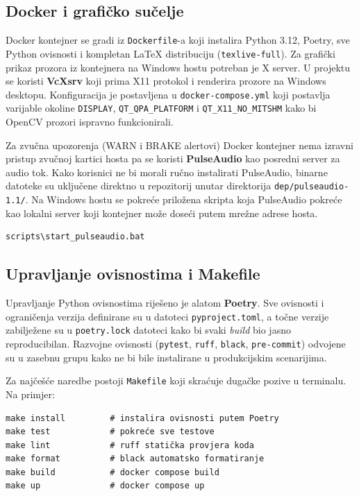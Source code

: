 \subsection{Docker i grafičko sučelje}

Docker kontejner se gradi iz \texttt{Dockerfile}-a koji instalira Python 3.12, Poetry, sve Python ovisnosti i kompletan LaTeX distribuciju (\texttt{texlive-full}). Za grafički prikaz prozora iz kontejnera na Windows hostu potreban je X server. U projektu se koristi \textbf{VcXsrv} koji prima X11 protokol i renderira prozore na Windows desktopu. Konfiguracija je postavljena u \texttt{docker-compose.yml} koji postavlja varijable okoline \texttt{DISPLAY}, \texttt{QT\_QPA\_PLATFORM} i \texttt{QT\_X11\_NO\_MITSHM} kako bi OpenCV prozori ispravno funkcionirali.

Za zvučna upozorenja (WARN i BRAKE alertovi) Docker kontejner nema izravni pristup zvučnoj kartici hosta pa se koristi \textbf{PulseAudio} kao posredni server za audio tok. Kako korisnici ne bi morali ručno instalirati PulseAudio, binarne datoteke su uključene direktno u repozitorij unutar direktorija \texttt{dep/pulseaudio-1.1/}. Na Windows hostu se pokreće priložena skripta koja PulseAudio pokreće kao lokalni server koji kontejner može doseći putem mrežne adrese hosta.

\begin{lstlisting}[style=bashcode, caption={Pokretanje PulseAudio servera na Windows hostu}, label={lst:pulseaudio}]
scripts\start_pulseaudio.bat
\end{lstlisting}

\subsection{Upravljanje ovisnostima i Makefile}

Upravljanje Python ovisnostima riješeno je alatom \textbf{Poetry}. Sve ovisnosti i ograničenja verzija definirane su u datoteci \texttt{pyproject.toml}, a točne verzije zabilježene su u \texttt{poetry.lock} datoteci kako bi svaki \textit{build} bio jasno reproducibilan. Razvojne ovisnosti (\texttt{pytest}, \texttt{ruff}, \texttt{black}, \texttt{pre-commit}) odvojene su u zasebnu grupu kako ne bi bile instalirane u produkcijskim scenarijima.

Za najčešće naredbe postoji \texttt{Makefile} koji skraćuje dugačke pozive u terminalu. Na primjer:

\begin{lstlisting}[style=bashcode, caption={Najčešće Makefile naredbe}, label={lst:makefile}]
make install         # instalira ovisnosti putem Poetry
make test            # pokreće sve testove
make lint            # ruff statička provjera koda
make format          # black automatsko formatiranje
make build           # docker compose build
make up              # docker compose up
\end{lstlisting}

